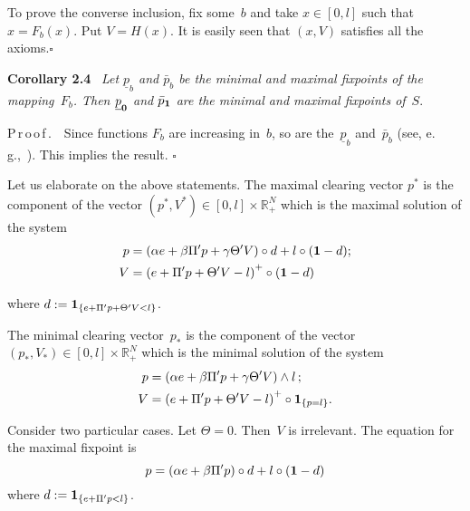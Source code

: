 \begin{multicols}{2}
\vspace*{-4pt}

To prove the converse inclusion,  fix some~$b$ and take $x \in [0, l]$ such that $x = F_b(x)$. Put $V = H(x)$. 
It is easily seen that $(x, V)$ satisfies all the axioms.\hfill$\square$


\smallskip

\noindent
\textbf{Corollary 2.4}\
\textit{Let  $\underline p_b$ and $\bar p_b$ be the minimal and maximal  fixpoints of the mapping~$F_b$. Then 
 $\underline p_{\bf 0}$ and $ \bar p_{\bf 1}$ are the minimal and maximal  fixpoints of}~$S$.

\smallskip

\noindent
P\,r\,o\,o\,f\,.\ \ 
Since functions $F_b$ are increasing in~$b$, so are the~$\underline p_b$ and~$\bar p_b$ (see, e.\,g.,~\cite{kabanov2018clearing}). This implies the result. 
\hfill$\square$


\smallskip

Let us elaborate on the above statements. The maximal clearing vector $p^*$ is the  component of the vector  $(p^*, V^*)\in [0,l]\times \mathbb{R}^N_+$ which is the maximal solution of the system 
\begin{align*}
    p& =  \left(\alpha e+\beta \Pi' p + \gamma \Theta' V\right) \circ d + l \circ ({\bf 1} - d); \\
     V &=  \left( e + \Pi' p +  \Theta' V - l\right)^+ \circ ({\bf 1} - d)
\end{align*}

\vspace*{-4pt}

\noindent
where $d := {\bf 1}_{\{e + \Pi' p + \Theta' V < l \}}$. 
 

The minimal clearing vector~$p_*$ is the  component of the vector  $(p_*, V_*)\in [0,l]\times \mathbb{R}^N_+$ which is the minimal solution of the system 
\begin{align*}
    p & =  \left(\alpha e+\beta \Pi' p + \gamma \Theta' V\right) \wedge l\,; \\
     V & = \left( e + \Pi' p +  \Theta' V - l\right)^+ \circ {\bf 1}_{\{p = l\}} .
\end{align*}

Consider two particular cases. Let $\Theta = 0$. Then~$V$ is irrelevant. The equation for the maximal fixpoint is
$$
p =   \left(\alpha e+\beta \Pi' p \right) \circ d + l \circ ({\bf 1} - d)
$$
where $d := {\bf 1}_{\{e + \Pi' p < l \}}$. 

\columnbreak



\end{multicols}
